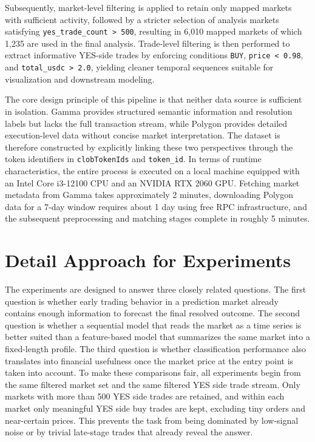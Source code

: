 \documentclass[11pt]{article}
\begin{document}
Subsequently, market-level filtering is applied to retain only mapped markets with sufficient activity, followed by a stricter selection of analysis markets satisfying \texttt{yes\_trade\_count \textgreater{} 500}, resulting in 6,010 mapped markets of which 1,235 are used in the final analysis. Trade-level filtering is then performed to extract informative YES-side trades by enforcing conditions \texttt{BUY}, \texttt{price \textless{} 0.98}, and \texttt{total\_usdc \textgreater{} 2.0}, yielding cleaner temporal sequences suitable for visualization and downstream modeling.

The core design principle of this pipeline is that neither data source is sufficient in isolation. Gamma provides structured semantic information and resolution labels but lacks the full transaction stream, while Polygon provides detailed execution-level data without concise market interpretation. The dataset is therefore constructed by explicitly linking these two perspectives through the token identifiers in \texttt{clobTokenIds} and \texttt{token\_id}. In terms of runtime characteristics, the entire process is executed on a local machine equipped with an Intel Core i3-12100 CPU and an NVIDIA RTX 2060 GPU. Fetching market metadata from Gamma takes approximately 2 minutes, downloading Polygon data for a 7-day window requires about 1 day using free RPC infrastructure, and the subsequent preprocessing and matching stages complete in roughly 5 minutes.

\section{Detail Approach for Experiments}

The experiments are designed to answer three closely related questions. The first question is whether early trading behavior in a prediction market already contains enough information to forecast the final resolved outcome. The second question is whether a sequential model that reads the market as a time series is better suited than a feature-based model that summarizes the same market into a fixed-length profile. The third question is whether classification performance also translates into financial usefulness once the market price at the entry point is taken into account. To make these comparisons fair, all experiments begin from the same filtered market set and the same filtered YES side trade stream. Only markets with more than 500 YES side trades are retained, and within each market only meaningful YES side buy trades are kept, excluding tiny orders and near-certain prices. This prevents the task from being dominated by low-signal noise or by trivial late-stage trades that already reveal the answer.
\end{document}
